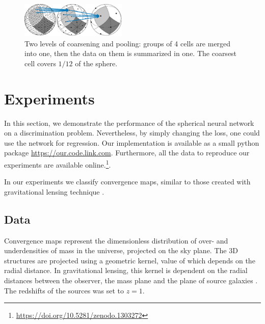 \documentclass[final,twocolumn,3p,times,authoryear]{elsarticle}
\newcommand{\todo}[1]{{\color[rgb]{.6,.1,.6}{#1}}}
\newcommand{\assign}[1]{{\color[rgb]{.8,.5,.8}{Assigned: #1 }}}
\newcommand{\1}{\b{1}}              %
\newcommand{\0}{\b{0}}              %
\begin{document}
\begin{figure}[!ht]
	\centering
	\includegraphics[width=0.45\textwidth]{figures/pooling.pdf}
	\caption{Two levels of coarsening and pooling: groups of 4 cells are merged into one, then the data on them is summarized in one. The coarsest cell covers $1/12$ of the sphere.}
	\label{fig:pooling}
\end{figure}


\section{Experiments}
\label{sec:experiments}
\assign{Nathanaël, Tomek}

In this section, we demonstrate the performance of the spherical neural network on a discrimination problem. Nevertheless, by simply changing the loss, one could use the network for regression.
Our implementation is available as a small python package \url{https://our.code.link.com}.
Furthermore, all the data to reproduce our experiments are available online.\footnote{\url{https://doi.org/10.5281/zenodo.1303272} \todo{Check DOI}}.

In our experiments we classify convergence maps, similar to those created with gravitational lensing technique \citep{chang2017curvedsky}.

\subsection{Data}
\label{sec:data}

Convergence maps represent the dimensionless distribution of over- and underdensities of mass in the universe, projected on the sky plane.
The 3D structures are projected using a geometric kernel, value of which depends on the radial distance.
In gravitational lensing, this kernel is dependent on the radial distances between the observer, the mass plane and the plane of source galaxies \citep[see][for review of gravitational lensing]{bartelman2010gravitationallensing}.
The redshifts of the sources was set to $z=1$.
\end{document}
